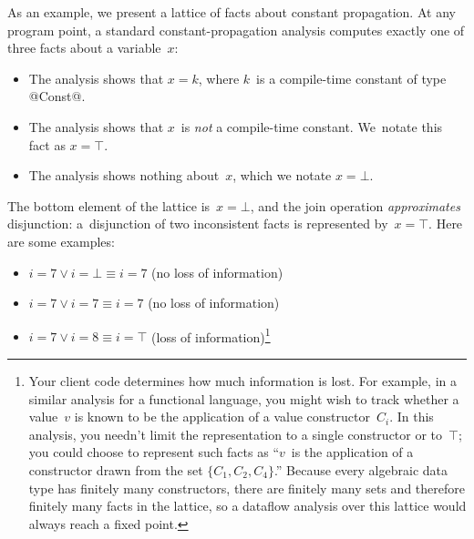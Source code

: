 \documentclass[blockstyle,preprint,natbib,nocopyrightspace]{sigplanconf}
\def\authornote#1{\unskip\relax}
\newcommand{\simon}[1]{\authornote{SLPJ: #1}}
\newcommand{\norman}[1]{\authornote{NR: #1}}
\let\remark\norman
\newcommand\secref[1]{Section~\ref{sec:#1}}
\begin{document}
As an example, 
we present a lattice of facts about constant propagation.
At any program point, a standard constant-propagation analysis
computes exactly one of three
facts about a variable~$x$:
\begin{itemize}
\item
The analysis shows that
$x = k$, where $k$~is a compile-time constant of type @Const@.
\item
The analysis shows that $x$~is \emph{not} a compile-time constant.
We~notate this fact as $x = \top$.
\item
The analysis shows nothing about~$x$, which we notate $x=\bot$.
\end{itemize}
The bottom element of the lattice is~$x=\bot$, and
\remark{I have a note saying ``it turns out that,'' but I've forgotten where
this phrase was supposed to be inserted.}
the join operation \emph{approximates} disjunction:\simon{No emphasis needed.}
a~disjunction of two inconsistent facts is represented by~$x=\top$.
\simon{I'd still like to give an intuition here about
\emph{why} disjunction is the key operation, and/or where is is used.
NR: Maybe in \secref{next-700}?
}%
\simon{This would be a better place for the footnote. NR: Which footnote?}
Here are some examples:
\begin{itemize}
\item
$i = 7 \lor i=\bot \equiv i=7$ (no loss of information)
\item
$i = 7 \lor i= 7 \equiv  i=7$ (no loss of information)
\item
$i = 7 \lor i = 8 \equiv i = \top$ (loss of information)\footnote
{Your client code determines how much information is lost.
For example, in a similar analysis for a functional language,
you might wish to track whether a value~$v$ is known to
be the application of a value constructor~$C_i$.
In this analysis, you needn't limit the representation to a
single constructor or to~$\top$;
you could choose to represent such facts as ``$v$~is
the application of a constructor drawn from the set $\{C_1, C_2,
C_4\}$.''
Because every algebraic data type has finitely many constructors,
there are finitely many sets and therefore finitely many facts in the
lattice, so a dataflow analysis over this lattice would always reach a
fixed point.
}

\end{itemize}
\end{document}
